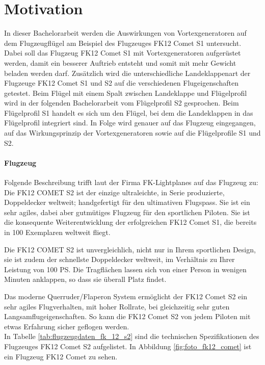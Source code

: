 \section{Motivation}
\label{sec:motivation}
In dieser Bachelorarbeit werden die Auswirkungen von Vortexgeneratoren auf dem Flugzeugflügel am Beispiel des Flugzeuges FK12 Comet S1 untersucht. Dabei soll das Flugzeug FK12 Comet S1 mit Vortexgeneratoren aufgerüstet werden, damit ein besserer Auftrieb entsteht und somit mit mehr Gewicht beladen werden darf. Zusätzlich wird die unterschiedliche Landeklappenart der Flugzeuge FK12 Comet S1 und S2 auf die verschiedenen Flugeigenschaften getestet. Beim Flügel mit einem Spalt zwischen Landeklappe und Flügelprofil wird in der folgenden Bachelorarbeit vom Flügelprofil S2 gesprochen. Beim Flügelprofil S1 handelt es sich um den Flügel, bei dem die Landeklappen in das Flügelprofil integriert sind.  In Folge wird genauer auf das Flugzeug eingegangen, auf das Wirkungsprinzip der Vortexgeneratoren sowie auf die Flügelprofile S1 und S2.


\paragraph{Flugzeug}
\label{subsec:flugzeug}
$\;$\\
Folgende Beschreibung trifft laut der Firma FK-Lightplanes \cite{Backus67} auf das Flugzeug zu: \guillemotleft{}Die FK12 COMET S2 ist der einzige ultraleichte, in Serie produzierte, Doppeldecker weltweit; handgefertigt für den ultimativen Flugspass. Sie ist ein sehr agiles, dabei aber gutmütiges Flugzeug für den sportlichen Piloten. Sie ist die konsequente Weiterentwicklung der erfolgreichen FK12 Comet S1, die bereits in 100 Exemplaren weltweit fliegt.

Die FK12 COMET S2 ist unvergleichlich, nicht nur in Ihrem sportlichen Design, sie ist zudem der schnellste Doppeldecker weltweit, im Verhältnis zu Ihrer Leistung von 100 PS. Die Tragflächen lassen sich von einer Person in wenigen Minuten anklappen, so dass sie überall Platz findet. 

Das moderne Querruder/Flaperon System ermöglicht der FK12 Comet S2 ein sehr agiles Flugverhalten, mit hoher Rollrate, bei gleichzeitig sehr guten Langsamflugeigenschaften. So kann die FK12 Comet S2 von jedem Piloten mit etwas Erfahrung sicher geflogen werden.\guillemotright{}\\
In Tabelle \ref{tab:flugzeugdaten_fk_12_s2} sind die technischen Spezifikationen des Flugzeuges FK12 Comet S2 aufgelistet. In Abbildung \ref{fig:foto_fk12_comet} ist ein Flugzeug FK12 Comet zu sehen.


